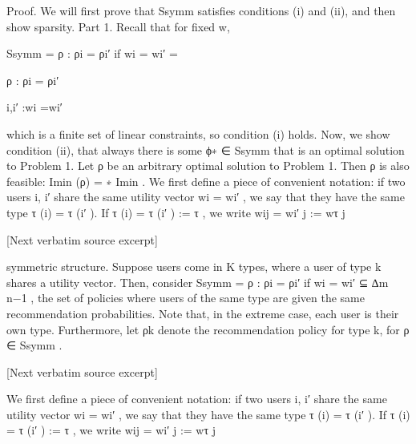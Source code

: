 \documentclass[10pt]{article}
\begin{document}
\begin{ReviewVerbatim}

Proof. We will first prove that Ssymm satisfies conditions (i) and (ii), and then show sparsity.
Part 1. Recall that for fixed w,
\

Ssymm = {ρ : ρi = ρi′ if wi = wi′ } =

{ρ : ρi = ρi′ }

i,i′ :wi =wi′

which is a finite set of linear constraints, so condition (i) holds.
Now, we show condition (ii), that always there is some ϕ∗ ∈ Ssymm that is an optimal solution to
Problem 1. Let ρ be an arbitrary optimal solution to Problem 1. Then ρ is also feasible: Imin (ρ) =
∗
Imin
.
We first define a piece of convenient notation: if two users i, i′ share the same utility vector wi = wi′ ,
we say that they have the same type τ (i) = τ (i′ ). If τ (i) = τ (i′ ) := τ , we write wij = wi′ j := wτ j

[Next verbatim source excerpt]

symmetric structure. Suppose users come in K types, where a user of type k shares a utility vector.
Then, consider Ssymm = {ρ : ρi = ρi′ if wi = wi′ } ⊆ ∆m
n−1 , the set of policies where users of the
same type are given the same recommendation probabilities. Note that, in the extreme case, each user
is their own type. Furthermore, let ρk denote the recommendation policy for type k, for ρ ∈ Ssymm .

[Next verbatim source excerpt]

We first define a piece of convenient notation: if two users i, i′ share the same utility vector wi = wi′ ,
we say that they have the same type τ (i) = τ (i′ ). If τ (i) = τ (i′ ) := τ , we write wij = wi′ j := wτ j
\end{ReviewVerbatim}
\end{document}
